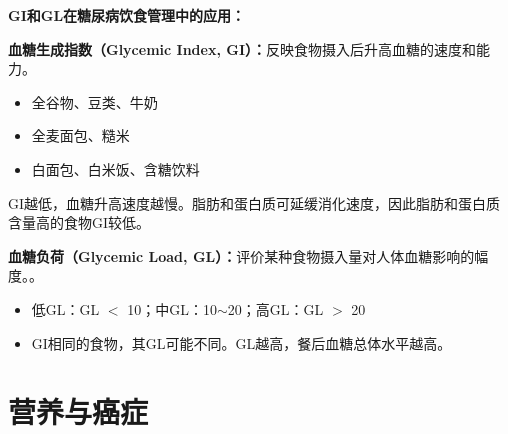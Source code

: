 \begin{defbox}
\textbf{GI和GL在糖尿病饮食管理中的应用：}

\textbf{血糖生成指数（Glycemic Index, GI）：}反映食物摄入后升高血糖的速度和能力。
\begin{itemize}[leftmargin=*]
    \item {}全谷物、豆类、牛奶
    \item {}全麦面包、糙米
    \item {}白面包、白米饭、含糖饮料
\end{itemize}
GI越低，血糖升高速度越慢。脂肪和蛋白质可延缓消化速度，因此脂肪和蛋白质含量高的食物GI较低。

\textbf{血糖负荷（Glycemic Load, GL）：}评价某种食物摄入量对人体血糖影响的幅度。。
\begin{itemize}[leftmargin=*]
    \item 低GL：GL $<$ 10；中GL：10$\sim$20；高GL：GL $>$ 20
    \item GI相同的食物，其GL可能不同。GL越高，餐后血糖总体水平越高。
\end{itemize}
\end{defbox}

\section{营养与癌症}

